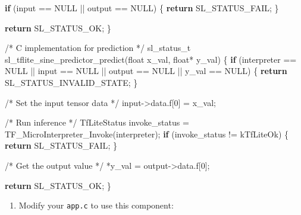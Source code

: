 \documentclass[
  9pt,
  letterpaper,
  abstract,
  titlepage]{scrbook}
\newenvironment{Shaded}{\begin{snugshade}}{\end{snugshade}}
\newcommand{\CommentTok}[1]{\textcolor[rgb]{0.37,0.37,0.37}{#1}}
\newcommand{\ControlFlowTok}[1]{\textcolor[rgb]{0.00,0.23,0.31}{\textbf{#1}}}
\newcommand{\DataTypeTok}[1]{\textcolor[rgb]{0.68,0.00,0.00}{#1}}
\newcommand{\DecValTok}[1]{\textcolor[rgb]{0.68,0.00,0.00}{#1}}
\newcommand{\NormalTok}[1]{\textcolor[rgb]{0.00,0.23,0.31}{#1}}
\newcommand{\OperatorTok}[1]{\textcolor[rgb]{0.37,0.37,0.37}{#1}}
\providecommand{\tightlist}{%
  \setlength{\itemsep}{0pt}\setlength{\parskip}{0pt}}\usepackage{longtable,booktabs,array}
\def\tightlist{}
\let\tightlist\relax
\begin{document}
\begin{Shaded}
\begin{Highlighting}[]
  \ControlFlowTok{if} \OperatorTok{(}\NormalTok{input }\OperatorTok{==}\NormalTok{ NULL }\OperatorTok{||}\NormalTok{ output }\OperatorTok{==}\NormalTok{ NULL}\OperatorTok{)} \OperatorTok{\{}
    \ControlFlowTok{return}\NormalTok{ SL\_STATUS\_FAIL}\OperatorTok{;}
  \OperatorTok{\}}

  \ControlFlowTok{return}\NormalTok{ SL\_STATUS\_OK}\OperatorTok{;}
\OperatorTok{\}}

\CommentTok{/* C implementation for prediction */}
\NormalTok{sl\_status\_t sl\_tflite\_sine\_predictor\_predict}\OperatorTok{(}\DataTypeTok{float}\NormalTok{ x\_val}\OperatorTok{,} \DataTypeTok{float}\OperatorTok{*}\NormalTok{ y\_val}\OperatorTok{)}
\OperatorTok{\{}
  \ControlFlowTok{if} \OperatorTok{(}\NormalTok{interpreter }\OperatorTok{==}\NormalTok{ NULL }\OperatorTok{||}\NormalTok{ input }\OperatorTok{==}\NormalTok{ NULL }\OperatorTok{||}\NormalTok{ output }\OperatorTok{==}\NormalTok{ NULL }\OperatorTok{||}\NormalTok{ y\_val }\OperatorTok{==}\NormalTok{ NULL}\OperatorTok{)} \OperatorTok{\{}
    \ControlFlowTok{return}\NormalTok{ SL\_STATUS\_INVALID\_STATE}\OperatorTok{;}
  \OperatorTok{\}}

  \CommentTok{/* Set the input tensor data */}
\NormalTok{  input}\OperatorTok{{-}\textgreater{}}\NormalTok{data}\OperatorTok{.}\NormalTok{f}\OperatorTok{[}\DecValTok{0}\OperatorTok{]} \OperatorTok{=}\NormalTok{ x\_val}\OperatorTok{;}

  \CommentTok{/* Run inference */}
\NormalTok{  TfLiteStatus invoke\_status }\OperatorTok{=}\NormalTok{ TF\_MicroInterpreter\_Invoke}\OperatorTok{(}\NormalTok{interpreter}\OperatorTok{);}
  \ControlFlowTok{if} \OperatorTok{(}\NormalTok{invoke\_status }\OperatorTok{!=}\NormalTok{ kTfLiteOk}\OperatorTok{)} \OperatorTok{\{}
    \ControlFlowTok{return}\NormalTok{ SL\_STATUS\_FAIL}\OperatorTok{;}
  \OperatorTok{\}}

  \CommentTok{/* Get the output value */}
  \OperatorTok{*}\NormalTok{y\_val }\OperatorTok{=}\NormalTok{ output}\OperatorTok{{-}\textgreater{}}\NormalTok{data}\OperatorTok{.}\NormalTok{f}\OperatorTok{[}\DecValTok{0}\OperatorTok{];}
  
  \ControlFlowTok{return}\NormalTok{ SL\_STATUS\_OK}\OperatorTok{;}
\OperatorTok{\}}
\end{Highlighting}
\end{Shaded}

\begin{enumerate}
\def\labelenumi{\arabic{enumi}.}
\setcounter{enumi}{2}
\tightlist
\item
  Modify your \texttt{app.c} to use this component:
\end{enumerate}
\end{document}
